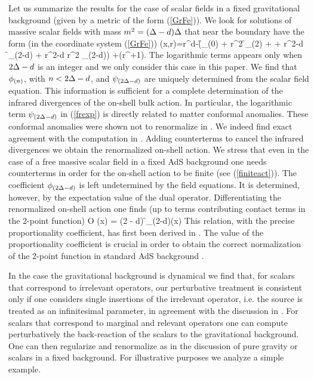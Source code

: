 Let us summarize the results for the case of scalar fields
in a fixed gravitational background (given by a 
metric of the form (\ref{GrFe})). We look for 
solutions of massive scalar fields with mass
$m^2=(\Delta-d) \Delta$
that near the boundary have the form (in the coordinate system (\ref{GrFe}))
\be \label{frexp}
\F(x,r)=r^{d-\D}\left(\f_{(0)} + r^2 \f_{(2)} + \cdots +
r^{2\D-d} \f_{(2\D-d)} + r^{2\D-d} \log r^2 \psi_{(2\D-d)}\right)
+\co(r^{\D+1}).
\ee
The logarithmic terms appears only when $2\Delta-d$ is an integer
and we only consider this case in this paper.
We find that $\phi_{(n)}$, with $n<2\Delta-d$, and $\psi_{(2\Delta-d)}$
are uniquely determined from the scalar field equation.
This information is sufficient for a complete 
determination of the infrared divergences of the 
on-shell bulk action. In particular, 
the logarithmic term $\psi_{(2\Delta-d)}$ in (\ref{frexp})
is directly related to matter conformal anomalies.
These conformal anomalies were shown not to renormalize
in \cite{PeSk}. We indeed find exact agreement with the computation 
in \cite{PeSk}. Adding counterterms to cancel 
the infrared divergences we obtain the renormalized on-shell
action. We stress that even in the case of a free 
massive scalar field in a fixed AdS background 
one needs counterterms in order for the on-shell action
to be finite (see (\ref{finiteact})).
The coefficient $\phi_{(2\Delta-d)}$ is left undetermined
by the field equations. It is determined, however, by the 
expectation value of the dual operator. Differentiating the 
renormalized on-shell action one finds (up to terms 
contributing contact terms in the 2-point function)
\be
\< O (x)\> = (2 \D- d) \f_{(2\D-d)}(x)
\ee
This relation, with the precise proportionality coefficient,
has first been derived in \cite{KleWit}. The value of the proportionality 
coefficient is crucial in order to obtain the correct 
normalization  of the 2-point function in standard
AdS background \cite{FMMR}.

In the case the gravitational background is dynamical we find that, 
for scalars that correspond to irrelevant operators, our
perturbative treatment is consistent only if one considers
single insertions of the irrelevant operator, i.e. the source
is treated as an infinitesimal parameter, in agreement with the discussion 
in \cite{Wit}. For scalars that correspond to marginal and
relevant operators one can compute perturbatively the back-reaction
of the scalars to the gravitational background. One can then 
regularize and renormalize as in the discussion of pure 
gravity or scalars in a fixed background. For illustrative
purposes we analyze a simple example.

